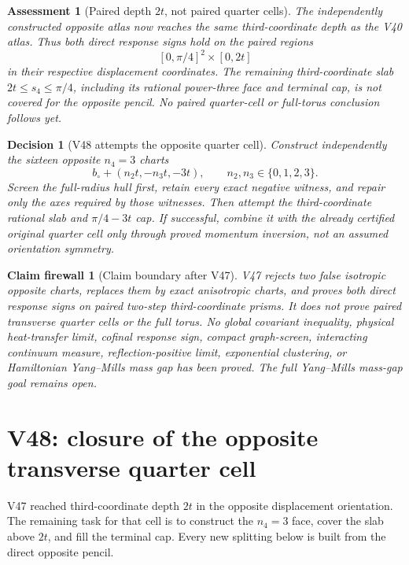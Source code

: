 \documentclass[11pt,oneside]{article}
\newtheorem{assessment}[theorem]{Assessment}
\newtheorem{firewall}[theorem]{Claim firewall}
\newtheorem{decision}[theorem]{Decision}
\theoremstyle{definition}
\theoremstyle{remark}
\begin{document}
\begin{assessment}[Paired depth \(2t\), not paired quarter cells]
\label{ass:newv47}
The independently constructed opposite atlas now reaches the same
third-coordinate depth as the V40 atlas.  Thus both direct response
signs hold on the paired regions
\[
 [0,\pi/4]^2\times[0,2t]
\]
in their respective displacement coordinates.  The remaining
third-coordinate slab \(2t\le s_4\le\pi/4\), including its rational
power-three face and terminal cap, is not covered for the opposite
pencil.  No paired quarter-cell or full-torus conclusion follows
yet.
\end{assessment}

\begin{decision}[V48 attempts the opposite quarter cell]
\label{dec:newv47-next}
Construct independently the sixteen opposite \(n_4=3\) charts
\[
 b_\circ+(n_2t,-n_3t,-3t),
 \qquad n_2,n_3\in\{0,1,2,3\}.                         \tag{47.21}
\]
Screen the full-radius hull first, retain every exact negative
witness, and repair only the axes required by those witnesses.
Then attempt the third-coordinate rational slab and
\(\pi/4-3t\) cap.  If successful, combine it with the already
certified original quarter cell only through proved momentum
inversion, not an assumed orientation symmetry.
\end{decision}

\begin{firewall}[Claim boundary after V47]
\label{fire:newv47-final}
V47 rejects two false isotropic opposite charts, replaces them by
exact anisotropic charts, and proves both direct response signs on
paired two-step third-coordinate prisms.  It does not prove paired
transverse quarter cells or the full torus.  No global covariant
inequality, physical heat-transfer limit, cofinal response sign,
compact graph-screen, interacting continuum measure,
reflection-positive limit, exponential clustering, or Hamiltonian
Yang--Mills mass gap has been proved.  The full Yang--Mills
mass-gap goal remains open.
\end{firewall}

\section{V48: closure of the opposite transverse quarter cell}
\label{sec:newv48-opposite-quarter-cell}

V47 reached third-coordinate depth \(2t\) in the opposite
displacement orientation.  The remaining task for that cell is to
construct the \(n_4=3\) face, cover the slab above \(2t\), and fill
the terminal cap.  Every new splitting below is built from the
direct opposite pencil.
\end{document}
